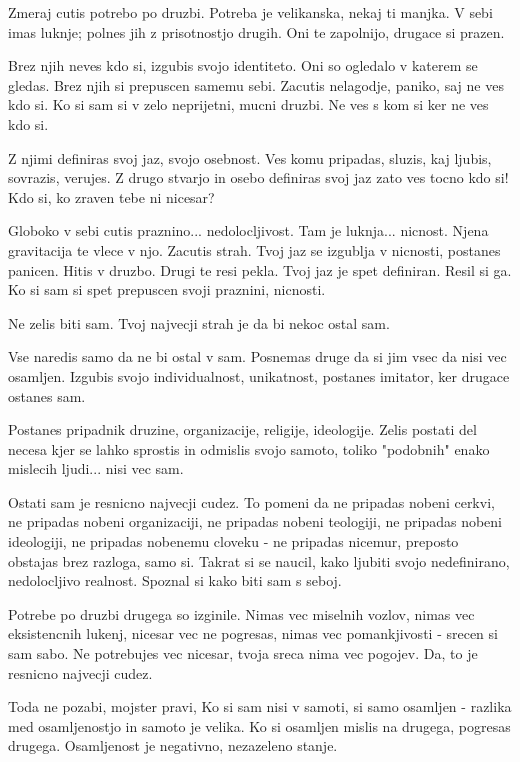         

   Zmeraj cutis potrebo po druzbi. Potreba je velikanska, nekaj ti manjka. V sebi imas luknje; polnes jih z prisotnostjo drugih. Oni te zapolnijo, drugace si prazen. 

Brez njih neves kdo si, izgubis svojo identiteto. Oni so ogledalo v katerem se gledas. Brez njih si prepuscen samemu sebi. Zacutis nelagodje, paniko, saj ne ves kdo si. Ko si sam si v zelo neprijetni, mucni druzbi. Ne ves s kom si ker ne ves kdo si. 

Z njimi definiras svoj jaz, svojo osebnost. Ves komu pripadas, sluzis, kaj ljubis, sovrazis, verujes. Z drugo stvarjo in osebo definiras svoj jaz zato ves tocno kdo si! Kdo si, ko zraven tebe ni nicesar? 

Globoko v sebi cutis praznino... nedolocljivost. Tam je luknja... nicnost. Njena gravitacija te vlece v njo. Zacutis strah. Tvoj jaz se izgublja v nicnosti, postanes panicen. Hitis v druzbo. Drugi te resi pekla. Tvoj jaz je spet definiran. Resil si ga. Ko si sam si spet prepuscen svoji praznini, nicnosti. 

Ne zelis biti sam. Tvoj najvecji strah je da bi nekoc ostal sam. 

Vse naredis samo da ne bi ostal v sam. Posnemas druge da si jim vsec da nisi vec osamljen. Izgubis svojo individualnost, unikatnost, postanes imitator, ker drugace ostanes sam. 

Postanes pripadnik druzine, organizacije, religije, ideologije. Zelis postati del necesa kjer se lahko sprostis in odmislis svojo samoto, toliko "podobnih" enako mislecih ljudi... nisi vec sam. 

Ostati sam je resnicno najvecji cudez. To pomeni da ne pripadas nobeni cerkvi, ne pripadas nobeni organizaciji, ne pripadas nobeni teologiji, ne pripadas nobeni ideologiji, ne pripadas nobenemu cloveku - ne pripadas nicemur, preposto obstajas brez razloga, samo si. Takrat si se naucil, kako ljubiti svojo nedefinirano, nedolocljivo realnost. Spoznal si kako biti sam s seboj. 

Potrebe po druzbi drugega so izginile. Nimas vec miselnih vozlov, nimas vec eksistencnih lukenj, nicesar vec ne pogresas, nimas vec pomankjivosti - srecen si sam sabo. Ne potrebujes vec nicesar, tvoja sreca nima vec pogojev. Da, to je resnicno najvecji cudez. 

Toda ne pozabi, mojster pravi,  Ko si sam nisi v samoti, si samo osamljen - razlika med osamljenostjo in samoto je velika. Ko si osamljen mislis na drugega, pogresas drugega. Osamljenost je negativno, nezazeleno stanje. 


